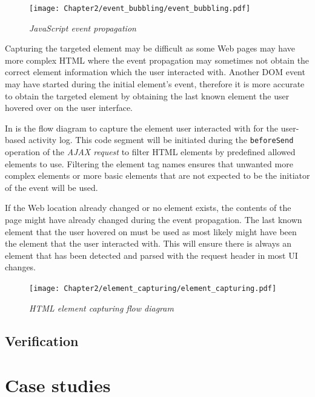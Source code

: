 \begin{figure}[!htb] %
	\centering %
	\texttt{[image: Chapter2/event\_bubbling/event\_bubbling.pdf]}
	\caption[JavaScript event propagation]
	{\textit{JavaScript event propagation~\cite{EventBubbling}}}\label{fig:ch2_event_bubbling}
\end{figure}

Capturing the targeted element may be difficult as some Web pages may have more complex HTML where the event propagation may sometimes not obtain the correct element information which the user interacted with. Another DOM event may have started during the initial element's event, therefore it is more accurate to obtain the targeted element by obtaining the last known element the user hovered over on the user interface.\par In  is the flow diagram to capture the element user interacted with for the user-based activity log. This code segment will be initiated during the \texttt{beforeSend} operation of the \textit{AJAX request} to filter HTML elements by predefined allowed elements to use. Filtering the element tag names ensures that unwanted more complex elements or more basic elements that are not expected to be the initiator of the event will be used. \par If the Web location already changed or no element exists, the contents of the page might have already changed during the event propagation. The last known element that the user hovered on must be used as most likely might have been the element that the user interacted with. This will ensure there is always an element that has been detected and parsed with the request header in most UI changes.

\clearpage

\begin{figure}[!htb] %
	\centering %
	\texttt{[image: Chapter2/element\_capturing/element\_capturing.pdf]}
	\caption[HTML element capturing flow diagram]
	{\textit{HTML element capturing flow diagram}}\label{fig:ch2_element_event_capturing}
\end{figure}

\subsection{Verification}

\section{Case studies}

